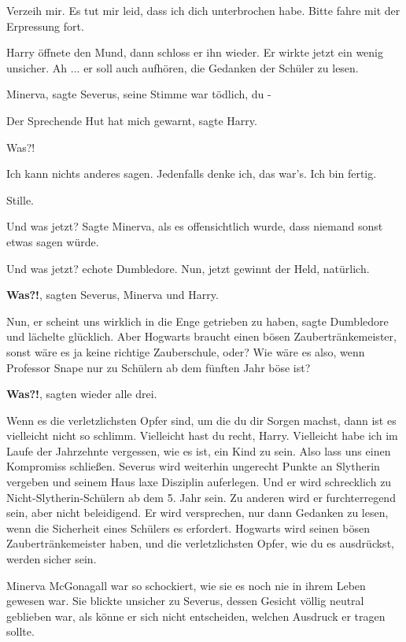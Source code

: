 \glqq{}Verzeih mir. Es tut mir leid, dass ich dich unterbrochen habe. Bitte fahre
mit der Erpressung fort.\grqq{}

Harry öffnete den Mund, dann schloss er ihn wieder. Er wirkte jetzt ein wenig
unsicher. \glqq{}Ah ... er soll auch aufhören, die Gedanken der Schüler zu
lesen.\grqq{}

\glqq{}Minerva\grqq{}, sagte Severus, seine Stimme war tödlich, \glqq{}du -\grqq{}

\glqq{}Der Sprechende Hut hat mich gewarnt\grqq{}, sagte Harry.

\glqq{}Was?!\grqq{}

\glqq{}Ich kann nichts anderes sagen. Jedenfalls denke ich, das war's. Ich bin
fertig.\grqq{}

Stille.

\glqq{}Und was jetzt?\grqq{} Sagte Minerva, als es offensichtlich wurde, dass
niemand sonst etwas sagen würde.

\glqq{}Und was jetzt?\grqq{} echote Dumbledore. \glqq{}Nun, jetzt gewinnt der
Held, natürlich.\grqq{}

\glqq{}\textbf{Was?!}\grqq{}, sagten Severus, Minerva und Harry.

\glqq{}Nun, er scheint uns wirklich in die Enge getrieben zu haben\grqq{}, sagte
Dumbledore und lächelte glücklich. \glqq{}Aber Hogwarts braucht einen bösen
Zaubertränkemeister, sonst wäre es ja keine richtige Zauberschule, oder? Wie
wäre es also, wenn Professor Snape nur zu Schülern ab dem fünften Jahr böse
ist?\grqq{}

\glqq{}\textbf{Was?!}\grqq{}, sagten wieder alle drei.

\glqq{}Wenn es die verletzlichsten Opfer sind, um die du dir Sorgen machst, dann
ist es vielleicht nicht so schlimm. Vielleicht hast du recht, Harry. Vielleicht
habe ich im Laufe der Jahrzehnte vergessen, wie es ist, ein Kind zu sein. Also
lass uns einen Kompromiss schließen. Severus wird weiterhin ungerecht Punkte an
Slytherin vergeben und seinem Haus laxe Disziplin auferlegen. Und er wird
schrecklich zu Nicht-Slytherin-Schülern ab dem 5. Jahr sein. Zu anderen wird er
furchterregend sein, aber nicht beleidigend. Er wird versprechen, nur dann
Gedanken zu lesen, wenn die Sicherheit eines Schülers es erfordert. Hogwarts
wird seinen bösen Zaubertränkemeister haben, und die verletzlichsten Opfer, wie
du es ausdrückst, werden sicher sein.\grqq{}

Minerva McGonagall war so schockiert, wie sie es noch nie in ihrem Leben gewesen
war. Sie blickte unsicher zu Severus, dessen Gesicht völlig neutral geblieben
war, als könne er sich nicht entscheiden, welchen Ausdruck er tragen sollte.

